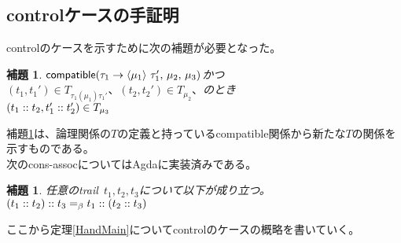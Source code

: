 \documentclass[japanese,draft]{jssst_ppl} %
\newtheorem{lemma}[definition]{補題}
\begin{document}
\subsection{controlケースの手証明}
controlのケースを示すために次の補題が必要となった。
\begin{lemma}
  $\Compatible{\Trail{\tau_1}{\tau_1'}{\mu_1}}{\mu_2}{\mu_3}$かつ$(t_1, t_1')\in T_{\tau_1(\mu_1)\tau_1'}、(t_2, t_2')\in T_{\mu_2}、$のとき\\
  $(\Cons{t_1}{t_2}, \Cons{t_1'}{t_2'})\in T_{\mu_3}$
\label{TCompatible}
\end{lemma}
補題\ref{TCompatible}は、論理関係の$T$の定義と持っている\textsf{compatible}関係から新たな$T$の関係を示すものである。\\
次の\textsf{cons-assoc}についてはAgdaに実装済みである。
\begin{lemma}
  任意のtrail\ $t_1,t_2,t_3$について以下が成り立つ。\\
  $\Cons{\ConsP{t_1}{t_2}}{t_3} =_{\beta} \Cons{t_1}{\ConsP{t_2}{t_3}}$
\label{ConsAssoc}
\end{lemma}
ここから定理\ref{HandMain}についてcontrolのケースの概略を書いていく。\\
\end{document}
